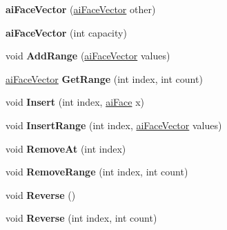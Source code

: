\begin{DoxyCompactItemize}
\item 
\hypertarget{classai_face_vector_a8a80e861cab827f2a8937e600b457590}{{\bfseries ai\+Face\+Vector} (\hyperlink{classai_face_vector}{ai\+Face\+Vector} other)}\label{classai_face_vector_a8a80e861cab827f2a8937e600b457590}

\item 
\hypertarget{classai_face_vector_a5f17c4300e5ad94f2c2d2f19d5f95b9a}{{\bfseries ai\+Face\+Vector} (int capacity)}\label{classai_face_vector_a5f17c4300e5ad94f2c2d2f19d5f95b9a}

\item 
\hypertarget{classai_face_vector_a5567ffc496502b4cf464290e37199fc5}{void {\bfseries Add\+Range} (\hyperlink{classai_face_vector}{ai\+Face\+Vector} values)}\label{classai_face_vector_a5567ffc496502b4cf464290e37199fc5}

\item 
\hypertarget{classai_face_vector_a29bb4bf60778c2181dd0068d190796f6}{\hyperlink{classai_face_vector}{ai\+Face\+Vector} {\bfseries Get\+Range} (int index, int count)}\label{classai_face_vector_a29bb4bf60778c2181dd0068d190796f6}

\item 
\hypertarget{classai_face_vector_acb915e5bb9a010c4e197616432d430c2}{void {\bfseries Insert} (int index, \hyperlink{structai_face}{ai\+Face} x)}\label{classai_face_vector_acb915e5bb9a010c4e197616432d430c2}

\item 
\hypertarget{classai_face_vector_aa38a14240e6ae7a644f565281ec66c85}{void {\bfseries Insert\+Range} (int index, \hyperlink{classai_face_vector}{ai\+Face\+Vector} values)}\label{classai_face_vector_aa38a14240e6ae7a644f565281ec66c85}

\item 
\hypertarget{classai_face_vector_ac76326306f99c05e4605a21817e22258}{void {\bfseries Remove\+At} (int index)}\label{classai_face_vector_ac76326306f99c05e4605a21817e22258}

\item 
\hypertarget{classai_face_vector_a11d2a27bde3dd543838ad1f877f0cfaa}{void {\bfseries Remove\+Range} (int index, int count)}\label{classai_face_vector_a11d2a27bde3dd543838ad1f877f0cfaa}

\item 
\hypertarget{classai_face_vector_ae3349af2d05e58a671858f274c3d3735}{void {\bfseries Reverse} ()}\label{classai_face_vector_ae3349af2d05e58a671858f274c3d3735}

\item 
\hypertarget{classai_face_vector_aaec474943d37f3703eb631578951eec7}{void {\bfseries Reverse} (int index, int count)}\label{classai_face_vector_aaec474943d37f3703eb631578951eec7}


\end{DoxyCompactItemize}
